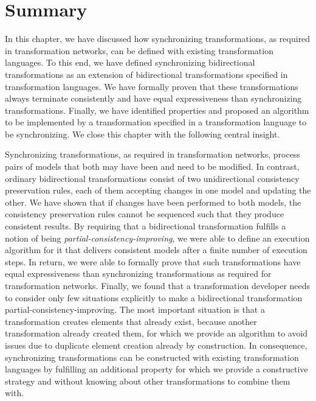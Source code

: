 \section{Summary}

In this chapter, we have discussed how synchronizing transformations, as required in transformation networks, can be defined with existing transformation languages.
To this end, we have defined synchronizing bidirectional transformations as an extension of bidirectional transformations specified in transformation languages.
We have formally proven that these transformations always terminate consistently and have equal expressiveness than synchronizing transformations.
Finally, we have identified properties and proposed an algorithm to be implemented by a transformation specified in a transformation language to be synchronizing.
We close this chapter with the following central insight.

\begin{insight}[Synchronization]
    Synchronizing transformations, as required in transformation networks, process pairs of models that both may have been and need to be modified.
    In contrast, ordinary bidirectional transformations consist of two unidirectional consistency preservation rules, each of them accepting changes in one model and updating the other.
    We have shown that if changes have been performed to both models, the consistency preservation rules cannot be sequenced such that they produce consistent results.
    By requiring that a bidirectional transformation fulfills a notion of being \emph{partial-consistency-improving}, we were able to define an execution algorithm for it that delivers consistent models after a finite number of execution steps.
    In return, we were able to formally prove that such transformations have equal expressiveness than synchronizing transformations as required for transformation networks.
    Finally, we found that a transformation developer needs to consider only few situations explicitly to make a bidirectional transformation partial-consistency-improving. 
    The most important situation is that a transformation creates elements that already exist, because another transformation already created them, for which we provide an algorithm to avoid issues due to duplicate element creation already by construction.
    In consequence, synchronizing transformations can be constructed with existing transformation languages by fulfilling an additional property for which we provide a constructive strategy and without knowing about other transformations to combine them with.
\end{insight}
